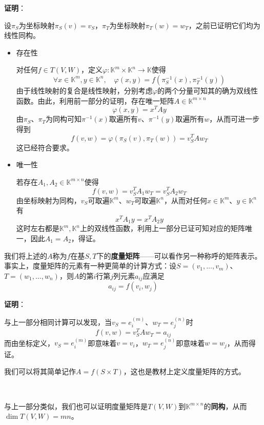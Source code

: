 \documentclass[a4paper,UTF8,fontset=windows,AutoFakeBold]{ctexart}
\newcommand*{\note}{\noindent *}
\newcommand{\proo}[1]{{\vspace{5pt}\kaishu\noindent\textbf{证明}：\vspace{-3pt}
\begin{compactitem}
    \item[] #1
\end{compactitem}
}}
\begin{document}
\proo{
    设$\pi_S$为坐标映射$\pi_S(v)=v_S$，$\pi_T$为坐标映射$\pi_T(w)=w_T$，之前已证明它们均为线性同构。

    \begin{itemize}
        \item 存在性
        
        对任何$f\in T(V,W)$，定义$\varphi:\mathbb{K}^m\times\mathbb{K}^n\to\mathbb{K}$使得
        $$\forall x\in\mathbb{K}^m,y\in\mathbb{K}^n,\quad\varphi(x,y)=f(\pi_S^{-1}(x),\pi_T^{-1}(y))$$
        由于线性映射的复合是线性映射，分别考虑$\varphi$的两个分量可知其的确为双线性函数。由此，利用前一部分的证明，存在唯一矩阵$A\in\mathbb{K}^{m\times n}$
        $$\varphi(x,y)=x^TAy$$
        由$\pi_S$、$\pi_T$为同构可知$\pi^{-1}(x)$取遍所有$v$、$\pi^{-1}(y)$取遍所有$w$，从而可进一步得到
        $$f(v,w)=\varphi(\pi_S(v),\pi_T(w))=v_S^TAw_T$$
        这已经符合要求。

        \item 唯一性
        
        若存在$A_1,A_2\in\mathbb{K}^{m\times n}$使得
        $$f(v,w)=v_S^TA_1w_T=v_S^TA_2w_T$$
        由坐标映射为同构，$v_S$可取遍$\mathbb{K}^m$、$w_T$可取遍$\mathbb{K}^n$，从而对任何$x\in\mathbb{K}^m$、$y\in\mathbb{K}^n$有
        $$x^TA_1y=x^TA_2y$$
        这时左右都是$\mathbb{K}^m,\mathbb{K}^n$上的双线性函数，利用上一部分已证可知对应的矩阵唯一，因此$A_1=A_2$，得证。
    \end{itemize}
}

我们将上述的$A$称为$f$在基$S,T$下的\textbf{度量矩阵}——可以看作另一种称呼的矩阵表示。事实上，度量矩阵的元素有一种更简单的计算方式：设$S=(v_1,\dots,v_m)$、$T=(w_1,\dots,w_n)$，则$A$的第$i$行第$j$列元素$a_{ij}$应满足
$$a_{ij}=f(v_i,w_j)$$

\proo{
    与上一部分相同计算可以发现，当$v_S=e_i^{(m)}$、$w_T=e_j^{(n)}$时
    $$f(v,w)=v_S^TAw_T=a_{ij}$$
    而由坐标定义，$v_S=e_i^{(m)}$即意味着$v=v_i$，$w_T=e_j^{(n)}$即意味着$w=w_j$，从而得证。
}

\note 我们可以将其简单记作$A=f(S\times T)$，这也是教材上定义度量矩阵的方式。


\

与上一部分类似，我们也可以证明度量矩阵是$T(V,W)$到$\mathbb{K}^{m\times n}$的\textbf{同构}，从而$\dim T(V,W)=mn$。
\end{document}
